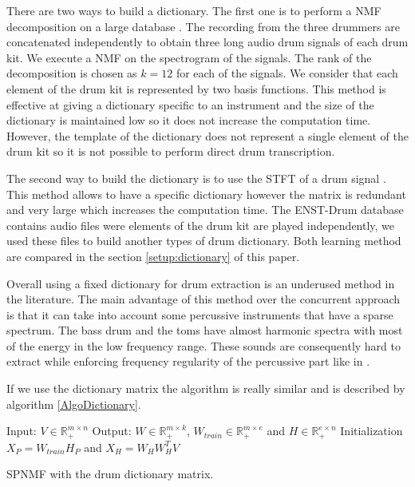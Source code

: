 \documentclass[journal]{IEEEtran}
\begin{document}
There are two ways to build a dictionary. The first one is to perform a NMF decomposition on a large database \cite{jaureguiberry2011adaptation}. The recording from the three drummers are concatenated independently to obtain three long audio drum signals of each drum kit. We execute a NMF on the spectrogram of the signals. The rank of the decomposition is chosen as $k=12$ for each of the signals. We consider that each element of the drum kit is represented by two basis functions. This method is effective at giving a dictionary specific to an instrument and the size of the dictionary is maintained low so it does not increase the computation time. However, the template of the dictionary does not represent a single element of the drum kit so it is not possible to perform direct drum transcription.

The second way to build the dictionary is to use the STFT of a drum signal \cite{wudrum}. This method allows to have a specific dictionary however the matrix is redundant and very large which increases the computation time. The ENST-Drum database contains audio files were elements of the drum kit are played independently, we used these files to build another types of drum dictionary. 
Both learning method are compared in the section \ref{setup:dictionary} of this paper.

Overall using a fixed dictionary for drum extraction is an underused method in the literature. The main advantage of this method over the concurrent approach is that it can take into account some percussive instruments that have a sparse spectrum. The bass drum and the toms have almost harmonic spectra with most of the energy in the low frequency range. These sounds are consequently hard to extract while enforcing frequency regularity of the percussive part like in \cite{canadas2014percussive,ono2008separation}.

If we use the dictionary matrix the algorithm is really similar and is described by algorithm \ref{AlgoDictionary}.
 
\begin{algorithm}[h]
 Input: $V \in \mathbb{R}_{+}^{m \times n} $
 Output: $W \in \mathbb{R}_{+}^{m \times k}$, $W_{train} \in \mathbb{R}_+^{m \times e}$ and $H \in \mathbb{R}_{+}^{e \times n}$
 Initialization\;
 $ X_P = W_{train}H_P $ and
 $ X_H = W_HW_H^TV $ 
  
\vspace{0.2cm}
 \caption{SPNMF with the drum dictionary matrix.}\label{AlgoDictionary}
\end{algorithm}
\end{document}
